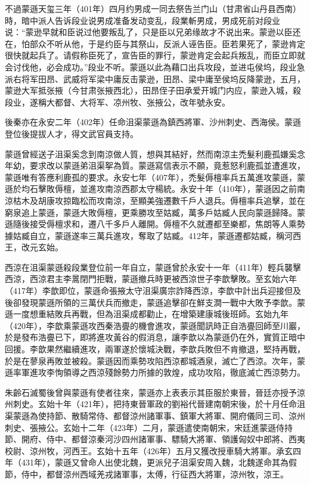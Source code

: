不過蒙遜天玺三年（401年）四月约男成一同去祭告兰门山（甘肃省山丹县西南）時，暗中派人告诉段业说男成准备发动变乱，段業斬男成，男成死前对段业说：“蒙逊早就和臣说过他要叛乱了，只是臣以兄弟缘故才不说出来。蒙逊以臣还在，怕部众不听从他，于是约臣与其祭山，反派人诬告臣。臣若果死了，蒙逊肯定很快就起兵了。请假称臣死了，宣告臣的罪行，蒙逊肯定会起兵叛乱，而臣立即就会讨伐他，必会成功。”段业不听。蒙遜以此為藉口出兵攻段，並进屯侯坞，段业急派右将军田昂、武威将军梁中庸反击蒙逊，田昂、梁中庸至侯坞反降蒙逊，五月，蒙逊大军抵张掖（今甘肃张掖西北），田昂侄子田承爱开城门内应，蒙逊入城，殺段业，遂稱大都督、大将军、凉州牧、张掖公，改年號永安。

後秦亦在永安二年（402年）任命沮渠蒙遜為鎮西將軍、沙州刺史、西海侯。蒙遜登位後提拔人才，得文武官員支持。

蒙遜曾經送子沮渠奚念到南涼做人質，想與其結好，然而南涼主禿髮利鹿孤嫌奚念年幼，要求改以蒙遜弟沮渠挐為質。蒙遜寫信表示不願，竟惹怒利鹿孤並遭進攻，蒙遜唯有答應利鹿孤的要求。永安七年（407年），禿髮傉檀率兵五萬進攻蒙遜，蒙遜於均石擊敗傉檀，並進攻南涼西郡太守楊統。永安十年（410年），蒙遜因之前南涼枯木及胡康攻掠臨松而攻南涼，至顯美強遷數千戶人退兵。傉檀率兵追擊，並在窮泉追上蒙遜，蒙遜大敗傉檀，更乘勝攻至姑臧，萬多戶姑臧人民向蒙遜歸降。蒙遜隨後接受傉檀求和，遷八千多戶人離開。傉檀不久就遷都至樂都，焦朗等人乘勢據姑臧自立，蒙遜遂率三萬兵進攻，奪取了姑臧。412年，蒙遜遷都姑臧，稱河西王，改元玄始。

西涼在沮渠蒙遜殺段業登位前一年自立，蒙遜曾於永安十一年（411年）輕兵襲擊西涼，西涼君主李暠閉門拒戰，蒙遜撤兵時更被西涼世子李歆擊敗。至玄始六年（417年）李歆即位，蒙遜命張掖太守沮渠廣宗詐降西涼，李歆中計出兵迎接但及後卻發現蒙遜所領的三萬伏兵而撤走，蒙遜追擊卻在鮮支澗一戰中大敗予李歆。蒙遜一度想重結敗兵再戰，但為沮渠成都勸止，在增築建康城後班師。玄始九年（420年），李歆乘蒙遜攻西秦浩亹的機會進攻，蒙遜聞訊時正自浩亹回師至川巖，於是發布浩亹已下，即將進攻黃谷的假消息，讓李歆以為蒙遜仍在外，實質正暗中回援。李歆果然繼續進攻，兩軍遂於懷城決戰，李歆兵敗但不肯撤退，堅持再戰，於是在蓼泉再敗並被殺。蒙遜因而乘勢攻陷西涼都城酒泉，滅亡了西涼。次年，蒙遜率軍進攻李恂領導之西涼殘餘勢力所據的敦煌，成功攻陷，徹底滅亡西涼勢力。

朱齡石滅蜀後曾與蒙遜有使者往來，蒙遜亦上表表示其臣服於東晉，晉廷亦授予涼州刺史。玄始十年（421年），把持東晉軍政的劉裕代晉建南朝宋後，於十月任命沮渠蒙遜為使持節、散騎常侍、都督涼州諸軍事、鎮軍大將軍、開府儀同三司、涼州刺史、張掖公。玄始十二年（423年）二月，蒙遜遣使南朝宋，宋廷進蒙遜侍持節、開府、侍中、都督涼秦河沙四州諸軍事、驃騎大將軍、領護匈奴中郎將、西夷校尉、涼州牧，河西王。玄始十五年（426年）五月又獲改授車騎大將軍。承玄四年（431年），蒙遜又曾命人出使北魏，更派兒子沮渠安周入魏，北魏遂命其為假節，侍中，都督涼州西域羌戎諸軍事，太傅，行征西大將軍，涼州牧，涼王。

